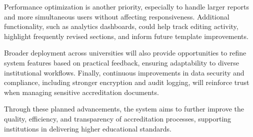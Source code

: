 Performance optimization is another priority, especially to handle larger reports and more simultaneous users without affecting responsiveness. Additional functionality, such as analytics dashboards, could help track editing activity, highlight frequently revised sections, and inform future template improvements.

Broader deployment across universities will also provide opportunities to refine system features based on practical feedback, ensuring adaptability to diverse institutional workflows. Finally, continuous improvements in data security and compliance, including stronger encryption and audit logging, will reinforce trust when managing sensitive accreditation documents.

Through these planned advancements, the system aims to further improve the quality, efficiency, and transparency of accreditation processes, supporting institutions in delivering higher educational standards.